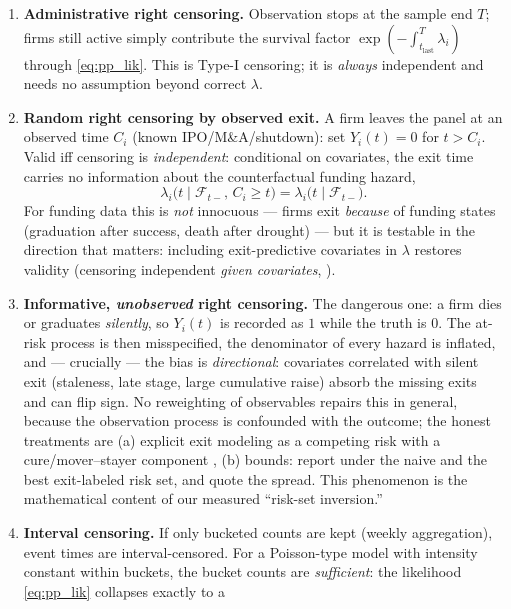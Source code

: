 \documentclass[11pt]{article}
\newcommand{\cF}{\mathcal{F}}
\numberwithin{assumption}{section}
\numberwithin{proposition}{section}
\numberwithin{remark}{section}
\begin{document}
\begin{enumerate}[leftmargin=1.6em]
\item \textbf{Administrative right censoring.} Observation stops at the
sample end $T$; firms still active simply contribute the survival factor
$\exp(-\int_{t_{\text{last}}}^{T}\lambda_i)$ through \eqref{eq:pp_lik}. This
is Type-I censoring; it is \emph{always} independent and needs no assumption
beyond correct $\lambda$.
\item \textbf{Random right censoring by observed exit.} A firm leaves the
panel at an observed time $C_i$ (known IPO/M\&A/shutdown): set $Y_i(t)=0$
for $t>C_i$. Valid iff censoring is \emph{independent}: conditional on
covariates, the exit time carries no information about the counterfactual
funding hazard,
\begin{equation}
\lambda_i\big(t \mid \cF_{t-},\, C_i \ge t\big)
= \lambda_i\big(t \mid \cF_{t-}\big).
\label{eq:indep_censoring}
\end{equation}
For funding data this is \emph{not} innocuous --- firms exit \emph{because}
of funding states (graduation after success, death after drought) --- but it
is testable in the direction that matters: including exit-predictive
covariates in $\lambda$ restores validity (censoring independent
\emph{given covariates}, \citealp{kalbfleisch2002}).
\item \textbf{Informative, \emph{unobserved} right censoring.} The dangerous
one: a firm dies or graduates \emph{silently}, so $Y_i(t)$ is recorded as
$1$ while the truth is $0$. The at-risk process is then misspecified, the
denominator of every hazard is inflated, and --- crucially --- the bias is
\emph{directional}: covariates correlated with silent exit (staleness, late
stage, large cumulative raise) absorb the missing exits and can flip sign.
No reweighting of observables repairs this in general, because the
observation process is confounded with the outcome; the honest treatments
are (a) explicit exit modeling as a competing risk with a cure/mover--stayer
component \citep{farewell1982}, (b) bounds: report under the naive and the
best exit-labeled risk set, and quote the spread. This phenomenon is the
mathematical content of our measured ``risk-set inversion.''
\item \textbf{Interval censoring.} If only bucketed counts are kept (weekly
aggregation), event times are interval-censored. For a Poisson-type model
with intensity constant within buckets, the bucket counts are
\emph{sufficient}: the likelihood \eqref{eq:pp_lik} collapses exactly to a

\end{enumerate}
\end{document}
